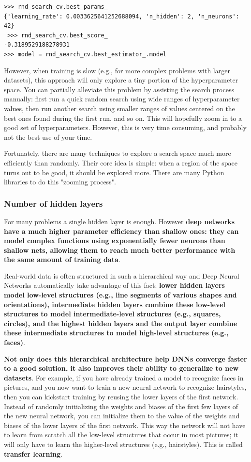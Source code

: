 \documentclass[12pt, letterpaper]{article}
\theoremstyle{definition}
\let\tb\textbf
\begin{document}
\begin{lstlisting}
>>> rnd_search_cv.best_params_
{'learning_rate': 0.0033625641252688094, 'n_hidden': 2, 'n_neurons': 42}
 >>> rnd_search_cv.best_score_
-0.3189529188278931
>>> model = rnd_search_cv.best_estimator_.model
\end{lstlisting}

However, when training is slow (e.g., for more complex problems with larger datasets), this approach will only explore a tiny portion of the hyperparameter space. You can partially alleviate this problem by assisting the search process manually: first run a quick random search using wide ranges of hyperparameter values, then run another search using smaller ranges of values centered on the best ones found during the first run, and so on. This will hopefully zoom in to a good set of hyperparameters. However, this is very time consuming, and probably not the best use of your time.

Fortunately, there are many techniques to explore a search space much more efficiently than randomly. Their core idea is simple: when a region of the space turns out to be good, it should be explored more. There are many Python libraries to do this "zooming process".

\subsubsection{Number of hidden layers}
For many problems a single hidden layer is enough. However \tb{deep networks have a much higher parameter efficiency than shallow ones: they can model complex functions using exponentially fewer neurons than shallow nets, allowing them to reach much better performance with the same amount of training data}.

Real-world data is often structured in such a hierarchical way and Deep Neural Networks automatically take advantage of this fact: \tb{lower hidden layers model low-level structures (e.g., line segments of various shapes and orientations), intermediate hidden layers combine these low-level structures to model intermediate-level structures (e.g., squares, circles), and the highest hidden layers and the output layer combine these intermediate structures to model high-level structures (e.g., faces)}.

\tb{Not only does this hierarchical architecture help DNNs converge faster to a good solution, it also improves their ability to generalize to new datasets}. For example, if you have already trained a model to recognize faces in pictures, and you now want to train a new neural network to recognize hairstyles, then you can kickstart training by reusing the lower layers of the first network. Instead of randomly initializing the weights and biases of the first few layers of the new neural network, you can initialize them to the value of the weights and biases of the lower layers of the first network. This way the network will not have to learn from scratch all the low-level structures that occur in most pictures; it will only have to learn the higher-level structures (e.g., hairstyles). This is called \tb{transfer learning}.
\end{document}
